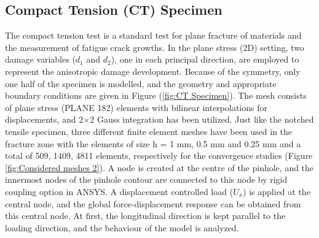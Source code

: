 \documentclass[12pt,a4paper,twoside,openright]{report}
\begin{document}
\subsection{Compact Tension (CT) Specimen}\label{CT specimen}
\indent\indent\indent The compact tension test is a standard test for plane fracture of materials and the measurement of fatigue crack growths. In the plane stress (2D) setting, two damage variables ($d_{1}$ and $d_{2}$), one in each principal direction, are employed to represent the anisotropic damage development.  Because of the symmetry, only one half of the specimen is modelled, and the geometry and appropriate boundary conditions \citep{peerlings1999enhanced} are given in Figure (\ref{fig:CT Specimen}). The mesh consists of plane stress (PLANE 182) elements with bilinear interpolations for displacements, and 2$\times$2 Gauss integration has been utilized. Just like the notched tensile specimen, three different finite element meshes have been used in the fracture zone with the elements of size h = 1 mm, 0.5 mm and 0.25 mm and a total of 509, 1409, 4811 elements, respectively for the convergence studies (Figure \ref{fig:Considered meshes 2}).  A node is created at the centre of the pinhole, and the innermost nodes of the pinhole contour are connected to this node by rigid coupling option in ANSYS. A displacement controlled load ($U_{x}$) is applied at the central node, and the global force-displacement response can be obtained from this central node.  At first, the longitudinal direction is kept parallel to the loading direction, and the behaviour of the model is analyzed.
\end{document}
